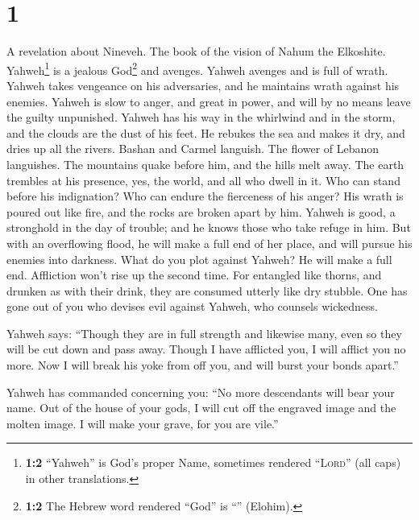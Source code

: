 \hypertarget{section}{%
\section{1}\label{section}}

 A revelation about Nineveh. The book of the vision of
Nahum the Elkoshite.  Yahweh\footnote{\textbf{1:2}
  ``Yahweh'' is God's proper Name, sometimes rendered ``\textsc{Lord}''
  (all caps) in other translations.} is a jealous God\footnote{\textbf{1:2}
  The Hebrew word rendered ``God'' is ``'' (Elohim).} and
avenges. Yahweh avenges and is full of wrath. Yahweh takes vengeance on
his adversaries, and he maintains wrath against his enemies.
 Yahweh is slow to anger, and great in power, and will by
no means leave the guilty unpunished. Yahweh has his way in the
whirlwind and in the storm, and the clouds are the dust of his feet.
 He rebukes the sea and makes it dry, and dries up all the
rivers. Bashan and Carmel languish. The flower of Lebanon languishes.
 The mountains quake before him, and the hills melt away.
The earth trembles at his presence, yes, the world, and all who dwell in
it.  Who can stand before his indignation? Who can endure
the fierceness of his anger? His wrath is poured out like fire, and the
rocks are broken apart by him.  Yahweh is good, a
stronghold in the day of trouble; and he knows those who take refuge in
him.  But with an overflowing flood, he will make a full
end of her place, and will pursue his enemies into darkness.
 What do you plot against Yahweh? He will make a full end.
Affliction won't rise up the second time.  For entangled
like thorns, and drunken as with their drink, they are consumed utterly
like dry stubble.  One has gone out of you who devises
evil against Yahweh, who counsels wickedness.

 Yahweh says: ``Though they are in full strength and
likewise many, even so they will be cut down and pass away. Though I
have afflicted you, I will afflict you no more.  Now I
will break his yoke from off you, and will burst your bonds apart.''

 Yahweh has commanded concerning you: ``No more
descendants will bear your name. Out of the house of your gods, I will
cut off the engraved image and the molten image. I will make your grave,
for you are vile.''

